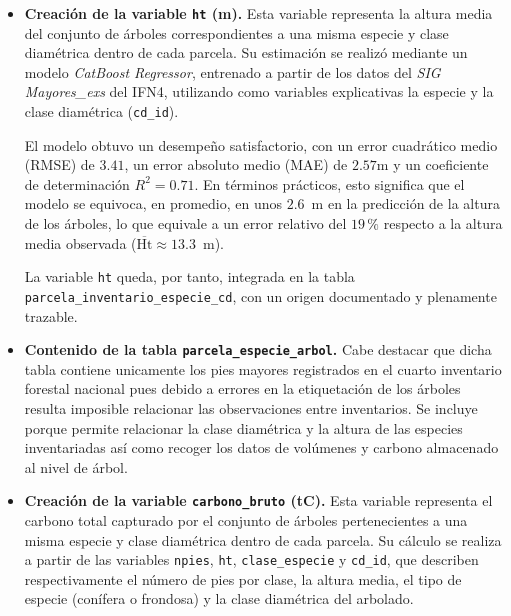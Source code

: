 \begin{itemize}
    \medskip

    \item \textbf{Creación de la variable \texttt{ht} (m).} Esta variable representa la altura media del conjunto de árboles correspondientes a una misma especie y clase diamétrica dentro de cada parcela. Su estimación se realizó mediante un modelo \textit{CatBoost Regressor}, entrenado a partir de los datos del \textit{SIG Mayores\_exs} del IFN4, utilizando como variables explicativas la especie y la clase diamétrica (\texttt{cd\_id}).  

    \medskip

    El modelo obtuvo un desempeño satisfactorio, con un error cuadrático medio (RMSE) de $3.41$, un error absoluto medio (MAE) de $2.57$m y un coeficiente de determinación $R^2 = 0.71$. En términos prácticos, esto significa que el modelo se equivoca, en promedio, en unos $2.6$~m en la predicción de la altura de los árboles, lo que equivale a un error relativo del $19\,\%$ respecto a la altura media observada ($\overline{\text{Ht}} \approx 13.3$~m).
    
    \medskip

    La variable \texttt{ht} queda, por tanto, integrada en la tabla \texttt{parcela\_inventario\_especie\_cd}, con un origen documentado y plenamente trazable.

    \medskip

    \item \textbf{Contenido de la tabla \texttt{parcela\_especie\_arbol}.} Cabe destacar que dicha tabla contiene unicamente los pies mayores registrados en el cuarto inventario forestal nacional pues debido a errores en la etiquetación de los árboles resulta imposible relacionar las observaciones entre inventarios. Se incluye porque permite relacionar la clase diamétrica y la altura de las especies inventariadas así como recoger los datos de volúmenes y carbono almacenado al nivel de árbol. 

    \item \textbf{Creación de la variable \texttt{carbono\_bruto} (tC).} Esta variable representa el carbono total capturado por el conjunto de árboles pertenecientes a una misma especie y clase diamétrica dentro de cada parcela. Su cálculo se realiza a partir de las variables \texttt{npies}, \texttt{ht}, \texttt{clase\_especie} y \texttt{cd\_id}, que describen respectivamente el número de pies por clase, la altura media, el tipo de especie (conífera o frondosa) y la clase diamétrica del arbolado.


\end{itemize}
